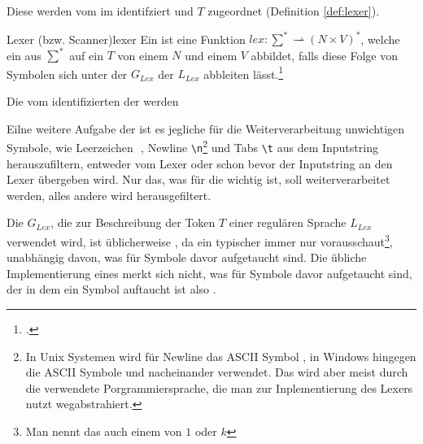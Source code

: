 Diese  werden vom  im  identifziert und  $T$ zugeordnet (Definition \ref{def:lexer}).

\begin{Definition}{Lexer (bzw. Scanner)}{lexer}
  Ein  ist eine  Funktion \hspace{0.2cm}$lex: \sum^{*} \rightharpoonup (N \times V)^{*}$, welche ein  aus $\sum^{*}$ auf ein  $T$ von einem  $N$ und einem   $V$ abbildet, falls diese Folge von Symbolen sich unter der  ${G}_{Lex}$ der  ${L_{Lex}}$ abbleiten lässt.\footcite{noauthor_lecture-notes-2021_2022}
\end{Definition}

Die vom  identifizierten  der  werden


Eilne weitere Aufgabe der  ist es jegliche für die Weiterverarbeitung unwichtigen Symbole, wie Leerzeichen \,\textvisiblespace\,, Newline \verb|\n|\footnote{In Unix Systemen wird für Newline das ASCII Symbol , in Windows hingegen die ASCII Symbole  und  nacheinander verwendet. Das wird aber meist durch die verwendete Porgrammiersprache, die man zur Inplementierung des Lexers nutzt wegabstrahiert.} und Tabs \verb|\t| aus dem Inputstring herauszufiltern, entweder vom Lexer oder schon bevor der Inputstring an den Lexer übergeben wird. Nur das, was für die  wichtig ist, soll weiterverarbeitet werden, alles andere wird herausgefiltert.

\begin{special_paragraph}
  Die  $G_{Lex}$, die zur Beschreibung der Token $T$ einer regulären Sprache $L_{Lex}$ verwendet wird, ist üblicherweise , da ein typischer  immer nur  vorausschaut\footnote{Man nennt das auch einem  von $1$ oder $k$}, unabhängig davon, was für Symbole davor aufgetaucht sind. Die übliche Implementierung eines  merkt sich nicht, was für Symbole davor aufgetaucht sind, der  in dem ein Symbol auftaucht ist also .
\end{special_paragraph}


